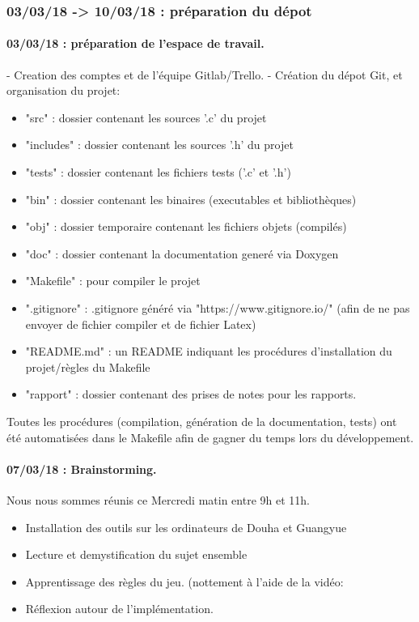 \documentclass[10pt]{article}
\begin{document}
			\subsubsection{03/03/18 -> 10/03/18 : préparation du dépot}
				\paragraph{03/03/18 : préparation de l'espace de travail.}
				- Creation des comptes et de l'équipe Gitlab/Trello.\newline
				- Création du dépot Git, et organisation du projet:
				\begin{itemize}
					\item "src" : dossier contenant les sources '.c' du projet
					\item "includes" : dossier contenant les sources '.h' du projet
					\item "tests" : dossier contenant les fichiers tests ('.c' et '.h')
					\item "bin" : dossier contenant les binaires (executables et bibliothèques)
					\item "obj" : dossier temporaire contenant les fichiers objets (compilés)
					\item "doc" : dossier contenant la documentation generé via Doxygen
					\item "Makefile" : pour compiler le projet
					\item ".gitignore" : .gitignore généré via "https://www.gitignore.io/" (afin de ne pas envoyer de fichier compiler et de fichier Latex)
					\item "README.md" : un README indiquant les procédures d'installation du projet/règles du Makefile
					\item "rapport" : dossier contenant des prises de notes pour les rapports.
				\end{itemize}
				Toutes les procédures (compilation, génération de la documentation, tests)
				ont été automatisées dans le Makefile afin de gagner du temps lors du développement.

				\paragraph{07/03/18 : Brainstorming.}\label{Brainstorming}
				Nous nous sommes réunis ce Mercredi matin entre 9h et 11h.
				\begin{itemize}
					\item Installation des outils sur les ordinateurs de Douha et Guangyue
					\item Lecture et demystification du sujet ensemble
					\item Apprentissage des règles du jeu. (nottement à l'aide de la vidéo: \cite{video_regle_jeu}
					\item Réflexion autour de l'implémentation.
				\end{itemize}
				
\end{document}
